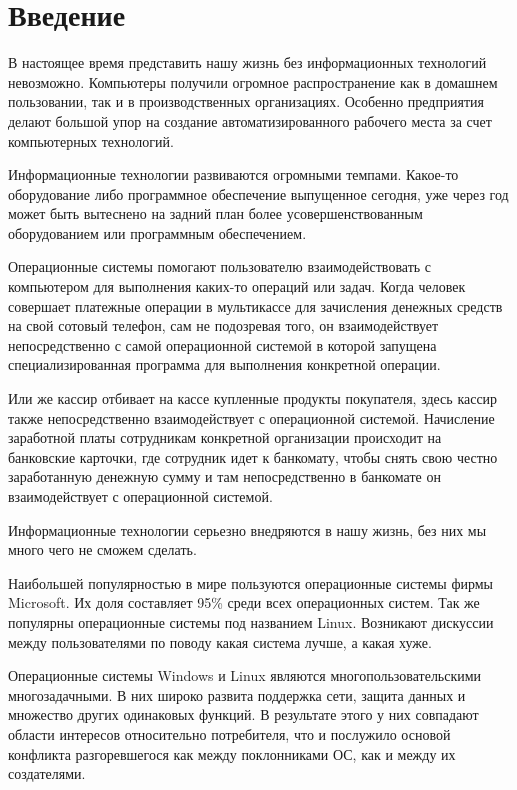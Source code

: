 \documentclass[14pt]{article}
\begin{document}
    \section{Введение}

    В настоящее время представить нашу жизнь без информационных технологий невозможно.
    Компьютеры получили огромное распространение как в домашнем пользовании, так и в производственных организациях.
    Особенно предприятия делают большой упор на создание автоматизированного рабочего места за счет компьютерных технологий.

    Информационные технологии развиваются огромными темпами.
    Какое-то оборудование либо программное обеспечение выпущенное сегодня, уже через год может быть вытеснено на задний план более усовершенствованным оборудованием или программным обеспечением.

    Операционные системы помогают пользователю взаимодействовать с компьютером для выполнения каких-то операций или задач.
    Когда человек совершает платежные операции в мультикассе для зачисления денежных средств на свой сотовый телефон, сам не подозревая того, он взаимодействует непосредственно с самой операционной системой в которой запущена специализированная программа для выполнения конкретной операции.

    Или же кассир отбивает на кассе купленные продукты покупателя, здесь кассир также непосредственно взаимодействует с операционной системой.
    Начисление заработной платы сотрудникам конкретной организации происходит на банковские карточки, где сотрудник идет к банкомату, чтобы снять свою честно заработанную денежную сумму и там непосредственно в банкомате он взаимодействует с операционной системой.

    Информационные технологии серьезно внедряются в нашу жизнь, без них мы много чего не сможем сделать.

    Наибольшей популярностью в мире пользуются операционные системы фирмы Microsoft.
    Их доля составляет 95\% среди всех операционных систем.
    Так же популярны операционные системы под названием Linux.
    Возникают дискуссии между пользователями по поводу какая система лучше, а какая хуже.

    Операционные системы Windows и Linux являются многопользовательскими многозадачными.
    В них широко развита поддержка сети, защита данных и множество других одинаковых функций.
    В результате этого у них совпадают области интересов относительно потребителя, что и послужило основой конфликта разгоревшегося как между поклонниками ОС, как и между их создателями.
\end{document}
